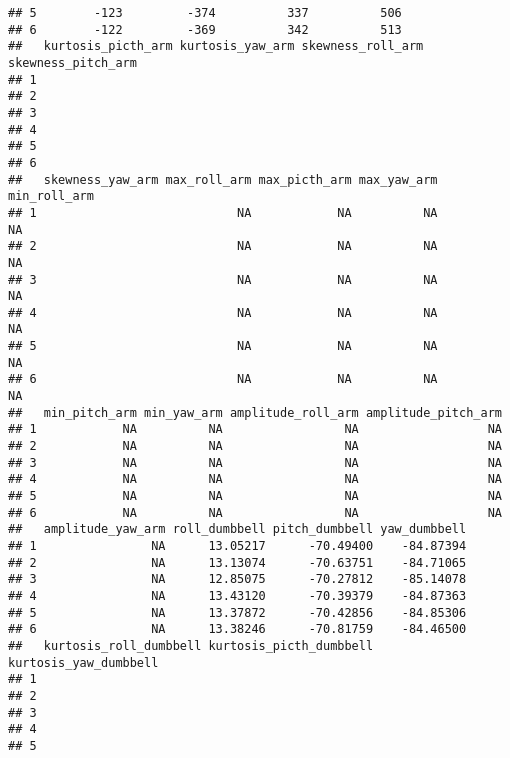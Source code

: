 \documentclass[]{article}
\begin{document}
\begin{verbatim}
## 5        -123         -374          337          506                  
## 6        -122         -369          342          513                  
##   kurtosis_picth_arm kurtosis_yaw_arm skewness_roll_arm skewness_pitch_arm
## 1                                                                         
## 2                                                                         
## 3                                                                         
## 4                                                                         
## 5                                                                         
## 6                                                                         
##   skewness_yaw_arm max_roll_arm max_picth_arm max_yaw_arm min_roll_arm
## 1                            NA            NA          NA           NA
## 2                            NA            NA          NA           NA
## 3                            NA            NA          NA           NA
## 4                            NA            NA          NA           NA
## 5                            NA            NA          NA           NA
## 6                            NA            NA          NA           NA
##   min_pitch_arm min_yaw_arm amplitude_roll_arm amplitude_pitch_arm
## 1            NA          NA                 NA                  NA
## 2            NA          NA                 NA                  NA
## 3            NA          NA                 NA                  NA
## 4            NA          NA                 NA                  NA
## 5            NA          NA                 NA                  NA
## 6            NA          NA                 NA                  NA
##   amplitude_yaw_arm roll_dumbbell pitch_dumbbell yaw_dumbbell
## 1                NA      13.05217      -70.49400    -84.87394
## 2                NA      13.13074      -70.63751    -84.71065
## 3                NA      12.85075      -70.27812    -85.14078
## 4                NA      13.43120      -70.39379    -84.87363
## 5                NA      13.37872      -70.42856    -84.85306
## 6                NA      13.38246      -70.81759    -84.46500
##   kurtosis_roll_dumbbell kurtosis_picth_dumbbell kurtosis_yaw_dumbbell
## 1                                                                     
## 2                                                                     
## 3                                                                     
## 4                                                                     
## 5                                                                     

\end{verbatim}
\end{document}
